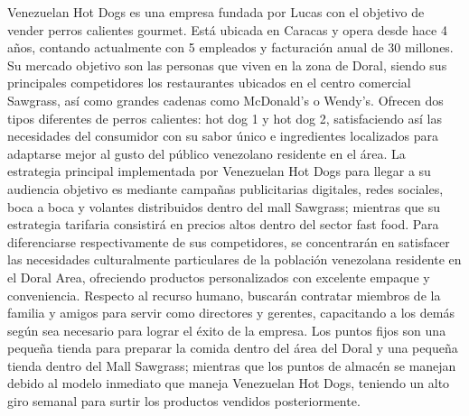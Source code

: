 Venezuelan Hot Dogs es una empresa fundada por Lucas con el objetivo de vender perros calientes gourmet. Está ubicada en Caracas y opera desde hace 4 años, contando actualmente con 5 empleados y facturación anual de 30 millones. Su mercado objetivo son las personas que viven en la zona de Doral, siendo sus principales competidores los restaurantes ubicados en el centro comercial Sawgrass, así como grandes cadenas como McDonald's o Wendy's. Ofrecen dos tipos diferentes de perros calientes: hot dog 1 y hot dog 2, satisfaciendo así las necesidades del consumidor con su sabor único e ingredientes localizados para adaptarse mejor al gusto del público venezolano residente en el área.
La estrategia principal implementada por Venezuelan Hot Dogs para llegar a su audiencia objetivo es mediante campañas publicitarias digitales, redes sociales, boca a boca y volantes distribuidos dentro del mall Sawgrass; mientras que su estrategia tarifaria consistirá en precios altos dentro del sector fast food. Para diferenciarse respectivamente de sus competidores, se concentrarán en satisfacer las necesidades culturalmente particulares de la población venezolana residente en el Doral Area, ofreciendo productos personalizados con excelente empaque y conveniencia. Respecto al recurso humano, buscarán contratar miembros de la familia y amigos para servir como directores y gerentes, capacitando a los demás según sea necesario para lograr el éxito de la empresa. Los puntos fijos son una pequeña tienda para preparar la comida dentro del área del Doral y una pequeña tienda dentro del Mall Sawgrass; mientras que los puntos de almacén se manejan debido al modelo inmediato que maneja Venezuelan Hot Dogs, teniendo un alto giro semanal para surtir los productos vendidos posteriormente.
